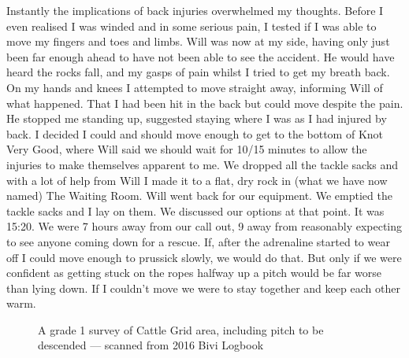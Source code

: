     Instantly the implications of back injuries overwhelmed my thoughts. Before I even realised I was winded and in some serious pain, I tested if I was able to move my fingers and toes and limbs. Will was now at my side, having only just been far enough ahead to have not been able to see the accident. He would have heard the rocks fall, and my gasps of pain whilst I tried to get my breath back. On my hands and knees I attempted to move straight away, informing Will of what happened. That I had been hit in the back but could move despite the pain. He stopped me standing up, suggested staying where I was as I had injured by back. I decided I could and should move enough to get to the bottom of Knot Very Good, where Will said we should wait for 10/15 minutes to allow the injuries to make themselves apparent to me. We dropped all the tackle sacks and with a lot of help from Will I made it to a flat, dry rock in (what we have now named) The Waiting Room. Will went back for our equipment. We emptied the tackle sacks and I lay on them. We discussed our options at that point. It was 15:20. We were 7 hours away from our call out, 9 away from reasonably expecting to see anyone coming down for a rescue. If, after the adrenaline started to wear off I could move enough to prussick slowly, we would do that. But only if we were confident as getting stuck on the ropes halfway up a pitch would be far worse than lying down. If I couldn’t move we were to stay together and keep each other warm.

    \begin{figure}[t]
        \checkoddpage \ifoddpage \forcerectofloat \else \forceversofloat \fi
        \centering
        \caption{A grade 1 survey of Cattle Grid area, including pitch to be descended --- scanned from 2016 Bivi Logbook}
        \label{Cattlegrid}
    \end{figure}

